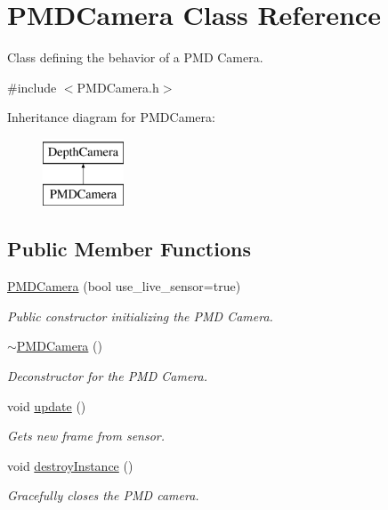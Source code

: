 \hypertarget{class_p_m_d_camera}{}\section{P\+M\+D\+Camera Class Reference}
\label{class_p_m_d_camera}


Class defining the behavior of a P\+MD Camera.  




{\ttfamily \#include $<$P\+M\+D\+Camera.\+h$>$}

Inheritance diagram for P\+M\+D\+Camera\+:\begin{figure}[H]
\begin{center}
\leavevmode
\includegraphics[height=2.000000cm]{class_p_m_d_camera}
\end{center}
\end{figure}
\subsection*{Public Member Functions}
\begin{DoxyCompactItemize}
\item 
\hyperlink{class_p_m_d_camera_a9965c089ec7eea8537e249d432c1dbba}{P\+M\+D\+Camera} (bool use\+\_\+live\+\_\+sensor=true)
\begin{DoxyCompactList}\small\item\em Public constructor initializing the P\+MD Camera. \end{DoxyCompactList}\item 
\hypertarget{class_p_m_d_camera_a645cc6c2b05896c776bfdde5bc1aa1f0}{}\label{class_p_m_d_camera_a645cc6c2b05896c776bfdde5bc1aa1f0} 
\hyperlink{class_p_m_d_camera_a645cc6c2b05896c776bfdde5bc1aa1f0}{$\sim$\+P\+M\+D\+Camera} ()
\begin{DoxyCompactList}\small\item\em Deconstructor for the P\+MD Camera. \end{DoxyCompactList}\item 
void \hyperlink{class_p_m_d_camera_aa6cb9398f9635436b4384ee2043def40}{update} ()
\begin{DoxyCompactList}\small\item\em Gets new frame from sensor. \end{DoxyCompactList}\item 
\hypertarget{class_p_m_d_camera_a13090aeffb98e1440e715a93e67d3c0e}{}\label{class_p_m_d_camera_a13090aeffb98e1440e715a93e67d3c0e} 
void \hyperlink{class_p_m_d_camera_a13090aeffb98e1440e715a93e67d3c0e}{destroy\+Instance} ()
\begin{DoxyCompactList}\small\item\em Gracefully closes the P\+MD camera. \end{DoxyCompactList}\end{DoxyCompactItemize}
